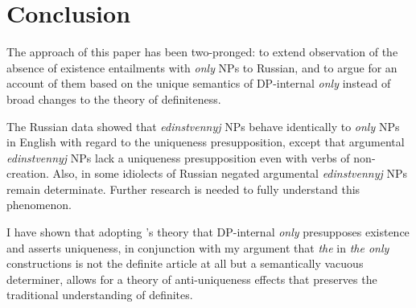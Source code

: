 \section{Conclusion \label{sec:conclusion}}
The approach of this paper has been two-pronged: to extend  observation of the absence of existence entailments with \textit{only} NPs to Russian, and to argue for an account of them based on the unique semantics of DP-internal \textit{only} instead of broad changes to the theory of definiteness.

The Russian data showed that \textit{edinstvennyj} NPs behave identically to \textit{only} NPs in English with regard to the uniqueness presupposition, except that argumental \textit{edinstvennyj} NPs lack a uniqueness presupposition even with verbs of non-creation. Also, in some idiolects of Russian negated argumental \textit{edinstvennyj} NPs remain determinate. Further research is needed to fully understand this phenomenon.

I have shown that adopting \citeauthor{cb2015}'s theory that DP-internal \textit{only} presupposes existence and asserts uniqueness, in conjunction with my argument that \textit{the} in \textit{the only} constructions is not the definite article at all but a semantically vacuous determiner, allows for a theory of anti-uniqueness effects that preserves the traditional understanding of definites.

